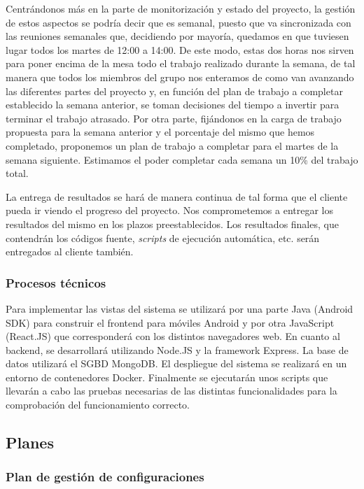 \documentclass{article}
\begin{document}
Centrándonos más en la parte de monitorización y estado del proyecto, la gestión de estos aspectos se podría decir que es semanal, puesto que va sincronizada con las reuniones semanales que, decidiendo por mayoría, quedamos en que tuviesen lugar todos los martes de 12:00 a 14:00. De este modo, estas dos horas nos sirven para poner encima de la mesa todo el trabajo realizado durante la semana, de tal manera que todos los miembros del grupo nos enteramos de como van avanzando las diferentes partes del proyecto y, en función del plan de trabajo a completar establecido la semana anterior, se toman decisiones del tiempo a invertir para terminar el trabajo atrasado. Por otra parte, fijándonos en la carga de trabajo propuesta para la semana anterior y el porcentaje del mismo que hemos completado, proponemos un plan de trabajo a completar para el martes de la semana siguiente. Estimamos el poder completar cada semana un 10\% del trabajo total.

La entrega de resultados se hará de manera continua de tal forma que el cliente pueda ir viendo el progreso del proyecto. Nos comprometemos a entregar los resultados del mismo en los plazos preestablecidos. Los resultados finales, que contendrán los códigos fuente, \textit{scripts} de ejecución automática, etc. serán entregados al cliente también.

\subsubsection{Procesos técnicos}
Para implementar las vistas del sistema se utilizará por una parte Java (Android SDK) para construir el frontend para móviles Android y por otra JavaScript (React.JS) que corresponderá con los distintos navegadores web.
En cuanto al backend, se desarrollará utilizando Node.JS y la framework Express. La base de datos utilizará el SGBD MongoDB.
El despliegue del sistema se realizará en un entorno de contenedores Docker.
Finalmente se ejecutarán unos scripts que llevarán a cabo las pruebas necesarias de las distintas funcionalidades para la comprobación del funcionamiento correcto.
\subsection{Planes}

\subsubsection{Plan de gestión de configuraciones}
\end{document}
